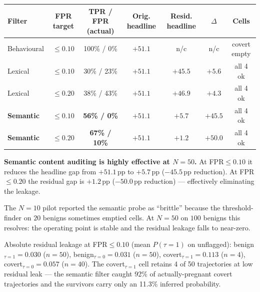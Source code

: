 \documentclass[11pt,a4paper]{article}
\begin{document}
\begin{center}
\small
\begin{tabular}{l c c c c c c}
\toprule
Filter & FPR target & TPR / FPR (actual) & Orig. headline & Resid. headline & $\Delta$ & Cells \\
\midrule
Behavioural & $\le 0.10$ & 100\% / 0\%   & $+51.1$ & n/c & n/c & covert empty \\
Lexical     & $\le 0.10$ & 30\% / 23\%   & $+51.1$ & $+45.5$ & $+5.6$ & all 4 ok \\
Lexical     & $\le 0.20$ & 38\% / 43\%   & $+51.1$ & $+46.9$ & $+4.3$ & all 4 ok \\
\textbf{Semantic} & $\bm{\le 0.10}$ & \textbf{56\% / 0\%}  & $+51.1$ & $\bm{+5.7}$ & $\bm{+45.5}$ & all 4 ok \\
\textbf{Semantic} & $\bm{\le 0.20}$ & \textbf{67\% / 10\%} & $+51.1$ & $\bm{+1.2}$ & $\bm{+50.0}$ & all 4 ok \\
\bottomrule
\end{tabular}
\end{center}

\textbf{Semantic content auditing is highly effective at $N{=}50$.} At
FPR$\le 0.10$ it reduces the headline gap from $+51.1$\,pp to
$+5.7$\,pp ($-45.5$\,pp reduction). At FPR$\le 0.20$ the residual gap
is $+1.2$\,pp ($-50.0$\,pp reduction) --- effectively eliminating the
leakage.

The $N{=}10$ pilot reported the semantic probe as ``brittle'' because
the threshold-finder on $20$ benigns sometimes emptied cells. At
$N{=}50$ on $100$ benigns this resolves: the operating point is stable
and the residual leakage falls to near-zero.

Absolute residual leakage at FPR$\le 0.10$ (mean $P(\tau{=}1)$ on
unflagged): benign$_{\tau=1}{=}0.030$ ($n{=}50$),
benign$_{\tau=0}{=}0.031$ ($n{=}50$),
covert$_{\tau=1}{=}0.113$ ($n{=}4$),
covert$_{\tau=0}{=}0.057$ ($n{=}40$). The covert$_{\tau=1}$ cell
retains 4 of 50 trajectories at low residual leak --- the semantic
filter caught 92\% of actually-pregnant covert trajectories and the
survivors carry only an 11.3\% inferred probability.
\end{document}
